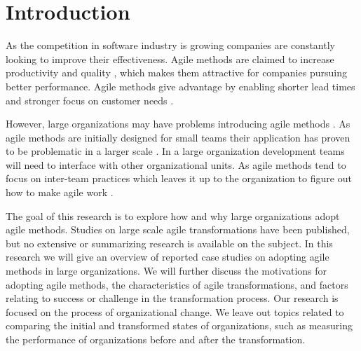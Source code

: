 \documentclass[lnbip]{svmultln}
\begin{document}
\section{Introduction}

As the competition in software industry is growing companies are constantly
looking to improve their effectiveness. Agile methods are claimed to increase
productivity and quality , which makes them attractive
for companies pursuing better performance. Agile methods give advantage by
enabling shorter lead times and stronger focus on customer needs
.

However, large organizations may have problems introducing agile methods
. As agile methods are initially designed for small teams
their application has proven to be problematic in a larger scale
. In a large organization development teams will need to
interface with other organizational units. As agile methods tend to focus on
inter-team practices which leaves it up to the organization to figure out how to
make agile work .

% 

The goal of this research is to explore how and why large organizations adopt
agile methods. Studies on large scale agile transformations have been published,
but no extensive or summarizing research is available on the subject. In this
research we will give an overview of reported case studies on adopting agile
methods in large organizations. We will further discuss the motivations for
adopting agile methods, the characteristics of agile transformations, and
factors relating to success or challenge in the transformation process. Our
research is focused on the process of organizational change. We leave out topics
related to comparing the initial and transformed states of organizations, such
as measuring the performance of organizations before and after the
transformation.
\end{document}
